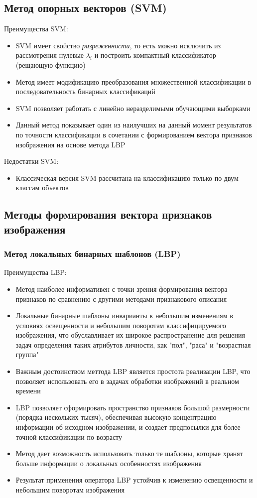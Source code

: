 \documentclass[12pt,a4paper]{article}
\begin{document}
\subsection{Метод опорных векторов (SVM)}
Преимущества SVM:
\begin{itemize}
    \item SVM имеет свойство \textit{разреженности}, то есть можно исключить из рассмотрения нулевые $\lambda_i$ и построить компактный классификатор (рещающую функцию)
    \item Метод имеет модификацию преобразования множественной классификации в последовательность бинарных классификаций
    \item SVM позволяет работать с линейно неразделимыми обучающими выборками
    \item Данный метод показывает один из наилучших на данный момент результатов по точности классификации в сочетании с формированием вектора признаков изображения на основе метода LBP
\end{itemize}

Недостатки SVM:
\begin{itemize}
    \item Классическая версия SVM рассчитана на классификацию только по двум классам объектов
\end{itemize}

\subsection{Методы формирования вектора признаков изображения}
\subsubsection{Метод локальных бинарных шаблонов (LBP)}
Преимущества LBP:
\begin{itemize}
    \item Метод наиболее информативен с точки зрения формирования вектора признаков по сравнению с другими методами признакового описания
    \item Локальные бинарные шаблоны инварианты к небольшим изменениям в условиях освещенности и небольшим поворотам классифицируемого изображения, что обуславливает их широкое распространение для решения задач определения таких атрибутов личности, как "пол", "раса" и "возрастная группа"
    \item Важным достоинством меттода LBP является простота реализации LBP, что позволяет использовать его в задачах обработки изображений в реальном времени
    \item LBP позволяет сформировать пространство признаков большой размерности (порядка нескольких тысяч), обеспечивая высокую концентрацию информации об исходном изображении, и создает предпосылки для более точной классификации по возрасту
    \item Метод дает возможность использовать только те шаблоны, которые хранят больше информации о локальных особенностях изображения
    \item Результат применения оператора LBP устойчив к изменению освещенности и небольшим поворотам изображения
\end{itemize}
\end{document}
